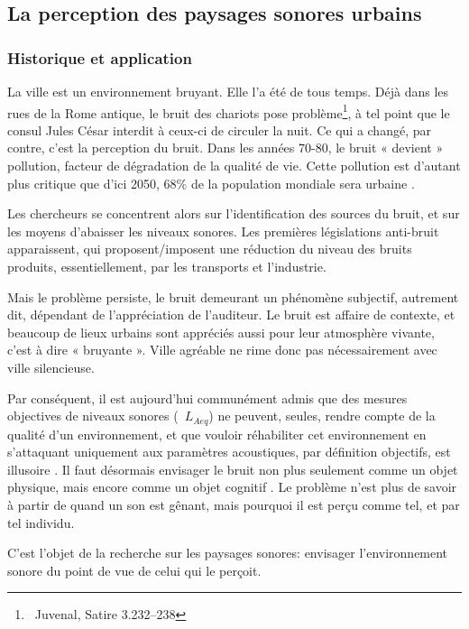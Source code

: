 \subsection{La perception des paysages sonores urbains}

\subsubsection{Historique et application}
\label{sec:ch3_urbanNoiseSoundscape}

La ville est un environnement bruyant. Elle l'a été de tous temps. Déjà dans les rues de la Rome antique, le bruit des chariots pose problème\footnote{\cf~Juvenal, Satire 3.232–238}, à tel point que le consul Jules César interdit à ceux-ci de circuler la nuit. Ce qui a changé, par contre, c'est la perception du bruit. Dans les années 70-80, le bruit « devient » pollution, facteur de dégradation de la qualité de vie. Cette pollution est d'autant plus critique que d'ici 2050, 68\% de la population mondiale sera urbaine \citep{park14}.

Les chercheurs se concentrent alors sur l'identification des sources du bruit, et sur les moyens d'abaisser les niveaux sonores. Les premières législations anti-bruit apparaissent, qui proposent/imposent une réduction du niveau des bruits produits, essentiellement, par les transports et l'industrie.

Mais le problème persiste, le bruit demeurant un phénomène subjectif, autrement dit, dépendant de l'appréciation de l'auditeur. Le bruit est affaire de contexte, et beaucoup de lieux urbains sont appréciés aussi pour leur atmosphère vivante, c'est à dire « bruyante ». Ville agréable ne rime donc pas nécessairement avec ville silencieuse.

Par conséquent, il est aujourd'hui communément admis que des mesures objectives de niveaux sonores (\eg~$L_{Aeq}$) ne peuvent, seules, rendre compte de la qualité d'un environnement, et que vouloir réhabiliter cet environnement en s'attaquant uniquement aux paramètres acoustiques, par définition objectifs, est illusoire \citep{yang2005acoustic,schulte2006soundscape,kang2010semantic,aletta2016soundscape}. Il faut désormais envisager le bruit non plus seulement comme un objet physique, mais encore comme un objet cognitif \citep{guastavino_etude_2003}. Le problème n'est plus de savoir à partir de quand un son est gênant, mais pourquoi il est perçu comme tel, et par tel individu.

C'est l'objet de la recherche sur les paysages sonores: envisager l'environnement sonore du point de vue de celui qui le perçoit.

